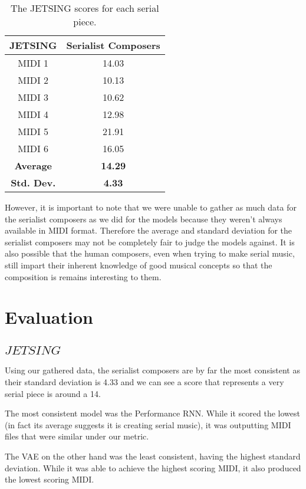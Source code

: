 \documentclass[11pt]{article}
\begin{document}
\begin{table}[h!]
    \centering
    \caption{The JETSING scores for each serial piece.}
    \begin{tabular}{c c}
        \hline
        JETSING & Serialist Composers \\
        \hline
        MIDI 1 & 14.03 \\
        \hline
        MIDI 2 & 10.13 \\
        \hline
        MIDI 3 & 10.62 \\
        \hline
        MIDI 4 & 12.98 \\
        \hline
        MIDI 5 & 21.91 \\
        \hline
        MIDI 6 & 16.05 \\
        \hline
        \hline
        \textbf{Average} & \textbf{14.29} \\
        \hline
        \textbf{Std. Dev.} & \textbf{4.33} \\
        \hline
    \end{tabular}
\end{table}

However, it is important to note that we were unable to gather as much data for the serialist composers as we did for the models because they weren't always available in MIDI format.
Therefore the average and standard deviation for the serialist composers may not be completely fair to judge the models against.
It is also possible that the human composers, even when trying to make serial music, still impart their inherent knowledge of good musical concepts so that the composition is remains interesting to them.

\section{Evaluation}

\subsection{$JETSING$}
Using our gathered data, the serialist composers are by far the most consistent as their standard deviation is 4.33 and we can see a score that represents a very serial piece is around a 14.

The most consistent model was the Performance RNN. While it scored the lowest (in fact its average suggests it is creating serial music), it was outputting MIDI files that were similar under our metric.

The VAE on the other hand was the least consistent, having the highest standard deviation.
While it was able to achieve the highest scoring MIDI, it also produced the lowest scoring MIDI.
\end{document}
